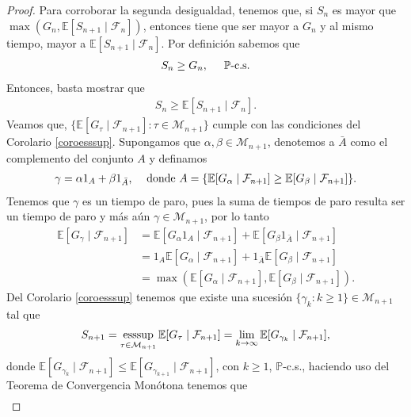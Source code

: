 \begin{proof}
Para corroborar la segunda desigualdad, tenemos que, si $S_n$ es mayor que $\max (G_n, \mathbb{E}[S_{n+1} \mid \mathcal{F}_n])$, entonces tiene que ser mayor a $G_n$ y al mismo tiempo, mayor a $\mathbb{E}[S_{n+1} \mid \mathcal{F}_n]$. Por definición sabemos que
	\begin{align}
	S_n \geq G_n, \hspace{0.5cm} \mathbb{P}\text{-c.s.}  \label{abh}
	\end{align}
Entonces, basta mostrar que 
	\begin{align*}
	S_n \geq \mathbb{E}[S_{n+1} \mid \mathcal{F}_n].
	\end{align*}
Veamos que, $\{ \mathbb{E}[G_\tau \mid \mathcal{F}_{n+1}] : \tau \in \mathcal{M}_{n+1} \}$ cumple con las condiciones del Corolario \ref{coroesssup}. Supongamos que $\alpha, \beta \in \mathcal{M}_{n+1}$, denotemos a $\bar{A}$ como el complemento del conjunto $A$ y definamos
	\begin{align*}
	\gamma = \alpha 1_A + \beta 1_{\bar{A}}, \hspace{0.3cm} \text{ donde } A = \{\mathbb{E}[G_\alpha \mid \mathcal{F}_{n+1}] \geq \mathbb{E}[G_\beta \mid \mathcal{F}_{n+1}]\}.
	\end{align*}
Tenemos que $\gamma$ es un tiempo de paro, pues la suma de tiempos de paro resulta ser un tiempo de paro y más aún $\gamma \in \mathcal{M}_{n+1}$, por lo tanto
	\begin{align*}
	\mathbb{E}[G_\gamma \mid \mathcal{F}_{n+1}] & = \mathbb{E}[G_\alpha 1_A \mid \mathcal{F}_{n+1}] + \mathbb{E}[G_\beta 1_{\bar{A}} \mid \mathcal{F}_{n+1}] \\
	& = 1_A \mathbb{E}[G_\alpha \mid \mathcal{F}_{n+1}] + 1_{\bar{A}} \mathbb{E}[G_\beta \mid \mathcal{F}_{n+1}] \\
	& = \max(\mathbb{E}[G_\alpha \mid \mathcal{F}_{n+1}], \mathbb{E}[G_\beta \mid \mathcal{F}_{n+1}]).
	\end{align*}
Del Corolario \ref{coroesssup} tenemos que existe una sucesión $\{\gamma_k : k \geq 1\} \in \mathcal{M}_{n+1}$ tal que 
	\begin{align*}
	S_{n+1} = \operatorname*{esssup}_{\tau \in \mathcal{M}_{n+1}} \mathbb{E}[G_\tau \mid \mathcal{F}_{n+1}] = \lim_{k \rightarrow \infty} \mathbb{E}[G_{\gamma_k} \mid \mathcal{F}_{n+1}],
	\end{align*}
donde $\mathbb{E}[G_{\gamma_k} \mid \mathcal{F}_{n+1}] \leq \mathbb{E}[G_{\gamma_{k+1}} \mid \mathcal{F}_{n+1}]$, con $k \geq 1$, $\mathbb{P}$-c.s., haciendo uso del Teorema de Convergencia Monótona tenemos que
	\begin{align}

\end{align}
\end{proof}
